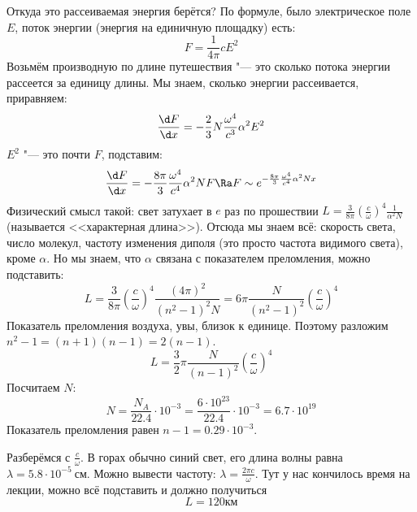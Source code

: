 Откуда это рассеиваемая энергия берётся?
По формуле, было электрическое поле $E$, поток энергии (энергия на единичную площадку) есть:
\[ F = \frac1{4\pi} c E^2 \]
Возьмём производную по длине путешествия "--- это сколько потока энергии рассеется за единицу длины.
Мы знаем, сколько энергии рассеивается, приравняем:
\[ \frac{\d F}{\d x} = -\frac 23 N \frac{\omega^4}{c^3} \alpha ^2 E^2 \]
$E^2$ "--- это почти $F$, подставим:
\[
\frac{\d F}{\d x} = -\frac{8\pi}{3} \frac{\omega^4}{c^4} \alpha^2 N F
\Ra
F \sim e^{-\frac{8\pi}{3} \frac{\omega^4}{c^4} \alpha^2 N x}
\]
Физический смысл такой: свет затухает в $e$ раз по прошествии $L=\frac{3}{8\pi} \left(\frac{c}{\omega}\right)^4 \frac{1}{\alpha^2 N}$
(называется <<характерная длина>>).
Отсюда мы знаем всё: скорость света, число молекул, частоту изменения диполя (это просто частота видимого света), кроме $\alpha$.
Но мы знаем, что $\alpha$ связана с показателем преломления, можно подставить:
\[
L = \frac{3}{8\pi} \left(\frac{c}{\omega}\right)^4 \frac{(4\pi)^2}{(n^2-1)^2 N}
= 6\pi \frac{N}{(n^2-1)^2} \left(\frac{c}{\omega}\right)^4
\]
Показатель преломления воздуха, увы, близок к единице.
Поэтому разложим $n^2-1=(n+1)(n-1)=2(n-1)$.
\[
L = \frac32\pi \frac{N}{(n-1)^2} \left(\frac{c}{\omega}\right)^4
\]
Посчитаем $N$:
\[
N=\frac{N_A}{22.4} \cdot 10^{-3} = \frac{6\cdot 10^{23}}{22.4} \cdot 10^{-3} = 6.7 \cdot 10^{19}
\]
Показатель преломления равен $n-1=0.29 \cdot 10^{-3}$.

Разберёмся с $\frac{c}{\omega}$.
В горах обычно синий свет, его длина волны равна $\lambda=5.8 \cdot 10^{-5}~см$.
Можно вывести частоту: $\lambda = \frac{2\pi c}{\omega}$.
Тут у нас кончилось время на лекции, можно всё подставить и должно получиться
\[ L = 120 км \]
